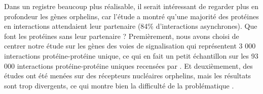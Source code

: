 \par Dans un registre beaucoup plus réalisable, il serait intéressant de regarder plus en profondeur les gènes orphelins, car l’étude a montré qu’une majorité des protéines en interactions attendaient leur partenaire (84\% d’interactions asynchrones). Que font les protéines sans leur partenaire ? Premièrement, nous avons choisi de centrer notre étude sur les gènes des voies de signalisation qui représentent 3 000 interactions protéine-protéine unique, ce qui en fait un petit échantillon sur les 93 000 interactions protéine-protéine uniques recensées par \cite{luck_proteome-scale_2017}. Et deuxièmement, des études ont été menées sur des récepteurs nucléaires orphelins, mais les résultats sont trop divergents, ce qui montre bien la difficulté de la problématique \parencite{markov_origin_2011}. 

\newpage
